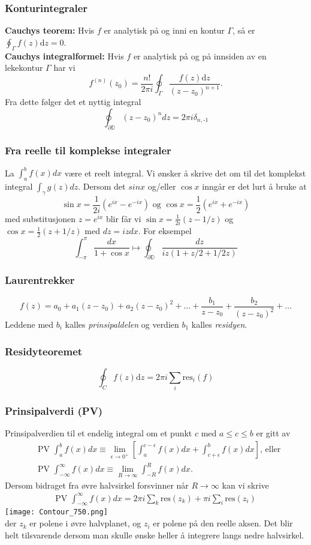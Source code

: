 \documentclass[a4paper, norsk, 8pt]{article}
\newcommand{\EQU}[1] { \begin{equation*} \begin{split}
#1  
\end{split} \end{equation*} }
\begin{document}
\begin{multicols*}{2}
\subsubsection*{\small Konturintegraler}
\textbf{Cauchys teorem:} Hvis $f$ er analytisk på og inni en kontur $\Gamma$, så er $\oint_\Gamma f(z)\mbox{d}z=0$.\\
\textbf{Cauchys integralformel:} Hvis $f$ er analytisk på og på innsiden av en lekekontur $\Gamma$ har vi
\[ f^{(n)}(z_0)=\frac{n!}{2\pi i}\oint_\Gamma \frac{f(z)\mbox{d}z}{(z-z_0)^{n+1}}. \]
Fra dette følger det et nyttig integral
\[
\oint_{\partial \mathbb{D} }(z-z_0)^n dz = 2\pi i \delta_{n,\mbox{-1}}
\]

\subsubsection*{\small Fra reelle til komplekse integraler}
La $\int_a^b f(x)dx$ være et reelt integral. Vi ønsker å skrive det om til det komplekst integral $\int_{\gamma}g(z)dz$. Dersom det $sin{x}$ og/eller $\cos{x}$ inngår er det lurt å bruke at 
\[
\sin{x}=\frac{1}{2i}\left(e^{ix}-e^{-ix}\right)\mbox{ og }\cos{x}=\frac{1}{2}\left( e^{ix}+e^{-ix} \right)
\]
med substitusjonen $z=e^{ix}$ blir får vi $\sin{x}=\frac{1}{2i}(z-1/z)$ og $\cos{x}=\frac{1}{2}(z+1/z)$ med $dz=izdx$. For eksempel
\[
\int_{-\pi}^{\pi}\frac{dx}{1+\cos{x}}\mapsto \oint_{\partial \mathbb{D} }\frac{dz}{iz(1+z/2+1/2z)}
\]

\subsubsection*{\small Laurentrekker}
\[  f(z)=a_0+a_1(z-z_0)+a_2(z-z_0)^2+...+\frac{b_1}{z-z_0}+\frac{b_2}{(z-z_0)^2}+... \]
Leddene med $b_i$ kalles \textit{prinsipaldelen} og verdien $b_1$ kalles \textit{residyen}.

\subsubsection*{\small Residyteoremet}
\[ \oint_C f(z)\mbox{d}z=2\pi i \sum_{i}\mbox{res}_i(f) \]

\subsubsection*{\small Prinsipalverdi (PV)}
Prinsipalverdien til et endelig integral om et punkt $c$ med $a\leq c \leq b$ er gitt av
\EQU{
& \mbox{PV }\int_a^b f(x)dx \equiv \lim_{\epsilon\rightarrow 0^+}\left[ \int_a^{c-\epsilon}f(x)dx+\int_{c+\epsilon}^b f(x)dx \right] \mbox{, eller} \\
& \mbox{PV } \int_{-\infty}^{\infty}f(x)dx\equiv \lim_{R\rightarrow \infty} \int_{-R}^{R}f(x)dx.
}
Dersom bidraget fra øvre halvsirkel forsvinner når $R\rightarrow \infty$ kan vi skrive
\EQU{
\mbox{PV }\int_{-\infty}^{\infty}f(x)dx=2\pi i \sum_k \mbox{res}(z_k) + \pi i \sum_{i} \mbox{res}(z_i)
}
\texttt{[image: Contour\_750.png]} \\
der $z_k$ er polene i øvre halvplanet, og $z_i$ er polene på den reelle aksen. Det blir helt tilsvarende dersom man skulle ønske heller å integrere langs nedre halvsirkel. 


\end{multicols*}
\end{document}
